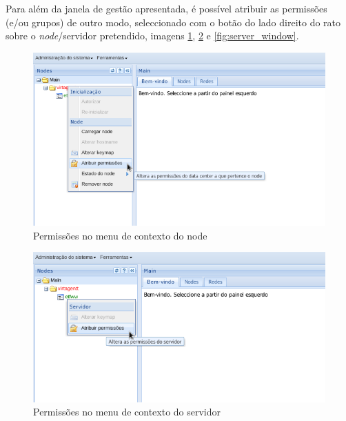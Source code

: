 Para além da janela de gestão apresentada, é possível atribuir as permissões (e/ou grupos) de outro modo, seleccionado com o botão do lado direito do rato sobre o \textit{node}/servidor pretendido, imagens \ref{fig:context_dc}, \ref{fig:context_server} e \ref{fig:server_window}.

\begin{figure}[H]
        \begin{center}
        \includegraphics[scale=0.4]{screenshots/permissions/context_dc.png}
        \caption{Permissões no menu de contexto do node}
        \label{fig:context_dc}
        \end{center}
\end{figure}

\begin{figure}[H]
        \begin{center}
        \includegraphics[scale=0.4]{screenshots/permissions/context_server.png}
        \caption{Permissões no menu de contexto do servidor}
        \label{fig:context_server}
        \end{center}
\end{figure}

